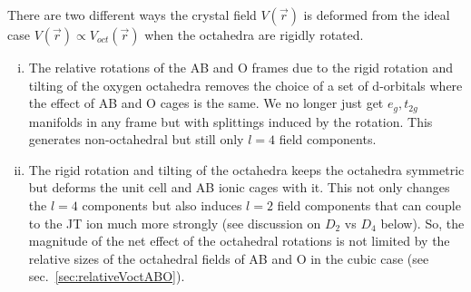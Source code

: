 \documentclass[a4paper,prb,twocolumn]{revtex4-1}  %
\newcommand{\com}[1]{}
\newcommand{\az}[1]{{\color{magenta}{#1}}} %
\begin{document}
\com{Before we present calculations and results, let's briefly
summarise the contribution of the AB cages towards the crystal field Hamiltonian
....}
 
There are two different ways the crystal field $V(\vec r)$
\az{[at the location of a B ion... which B ion out of four in distorted structure?... pick one here...]}
 is deformed from the ideal case $V(\vec r) \propto V_{oct}(\vec r)$
 when the octahedra are rigidly rotated. 
\begin{enumerate}[(i)]
\item
The relative rotations of the AB and O frames due to
the rigid rotation and tilting of the oxygen octahedra removes the
choice of a set of d-orbitals where the effect of 
AB and O cages is the same. 
We no longer just get $e_g, t_{2g}$ manifolds in any frame but with splittings induced by the rotation.
This generates non-octahedral but still only $l=4$ field components. 
\item
The rigid rotation and tilting of the octahedra keeps the octahedra symmetric but deforms the unit cell and AB ionic cages with it.
This not only changes the $l=4$ components but also induces 
$l=2$ field components
that can couple to the JT ion much more strongly (see discussion on $D_2$ vs $D_4$ below).
So, the magnitude of the net effect of the octahedral rotations is not limited by the relative sizes of the octahedral fields of AB and O in the cubic case (see sec.~\ref{sec:relativeVoctABO}).
\end{enumerate}




\com{
There are two different ways the crystal field $V(\vec r)$
 is deformed from the ideal case, $V_{voct}(\vec r)$.
\begin{enumerate}
\item The relative rotations of the AB and O frames due to
the rigid rotation and tilting of the oxygen octahedra removes the
choice of a set of d-orbitals where the effect of 
AB and O cages is the same. 
We no longer just get eg-t2g in any frame but with splittings induced by the rotation.
This can generate non-octahedral but still $l=4$ field components. 
\item
The rigid rotation and tilting of the octahedra keeps the octahedra symmetric but deforms the unit cell and AB ionic cages with it.
This not only changes the $l=4$ components but also induces 
$l=2$ field components
that can couple to the JT ion much more strongly (see discussion on $D_2$ vs $D_4$ below).
So, the magnitude of the net effect of the octahedral rotations is not limited by the relative sizes of the octahedral fields of AB and O in the cubic case (see sec.~\ref{sec:relativeVoctABO}).
\end{enumerate}

}
\end{document}
